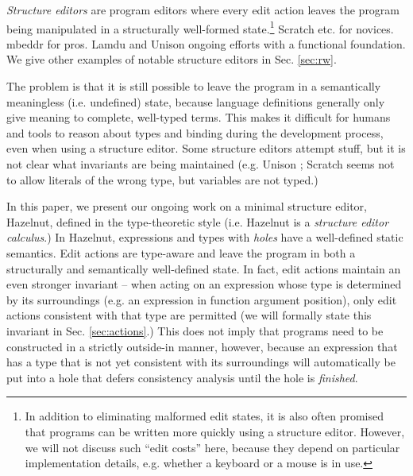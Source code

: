 
\emph{Structure editors} are program editors where every edit action leaves the program being manipulated in a 
structurally well-formed state.\footnote{In addition to eliminating malformed edit states, it is also often promised that programs can be written more quickly using a structure editor. However, we will not discuss such ``edit costs'' here, because they depend on particular implementation details, e.g. whether a keyboard or a mouse is in use.} Scratch etc. for novices. mbeddr for pros. Lamdu and Unison ongoing efforts with a functional foundation. We give other examples of notable structure editors in Sec. \ref{sec:rw}.

The problem is that it is still possible to leave the program in a semantically meaningless (i.e. undefined) state, because language definitions generally only give meaning to complete, well-typed terms. This makes it difficult for humans and tools to reason about types and binding during the development process, even when using a structure editor. Some structure editors attempt stuff, but it is not clear what invariants are being maintained (e.g. Unison ; Scratch seems not to allow literals of the wrong type, but variables are not typed.) %


In this paper, we present our ongoing work on a minimal structure editor, Hazelnut,  defined in the type-theoretic style (i.e. Hazelnut is a \emph{structure editor calculus}.) In Hazelnut, expressions and types with \emph{holes} have a well-defined static semantics. Edit actions are type-aware and leave the program in both a structurally and semantically well-defined state. In fact, edit actions maintain an even stronger invariant -- when acting on an expression whose type is determined by its surroundings (e.g. an expression in function argument position), only edit actions consistent with that type are permitted (we will formally state this invariant in Sec. \ref{sec:actions}.) This does not imply that programs need to be constructed in a strictly outside-in manner, however, because an expression that has a type that is not yet consistent with its surroundings will automatically be put into a {hole} that defers consistency analysis until the hole is \emph{finished}.

